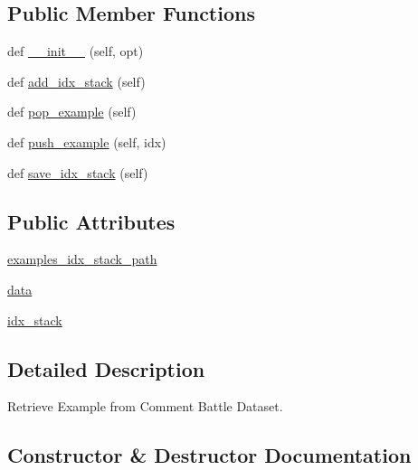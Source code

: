 \subsection*{Public Member Functions}
\begin{DoxyCompactItemize}
\item 
def \hyperlink{classigc__evals_1_1worlds_1_1IGCExampleGenerator_a44d9772a080f6ec923cdd13392a47f5e}{\+\_\+\+\_\+init\+\_\+\+\_\+} (self, opt)
\item 
def \hyperlink{classigc__evals_1_1worlds_1_1IGCExampleGenerator_aa0801aa3a53c7fd57a759c2080936174}{add\+\_\+idx\+\_\+stack} (self)
\item 
def \hyperlink{classigc__evals_1_1worlds_1_1IGCExampleGenerator_a68420b6b80ae5d3a8825302359371ed5}{pop\+\_\+example} (self)
\item 
def \hyperlink{classigc__evals_1_1worlds_1_1IGCExampleGenerator_a34dc6ef46a9ba8a1c72c8b674ff444b9}{push\+\_\+example} (self, idx)
\item 
def \hyperlink{classigc__evals_1_1worlds_1_1IGCExampleGenerator_a3f787da040d9b83d9c857b8ef65d36eb}{save\+\_\+idx\+\_\+stack} (self)
\end{DoxyCompactItemize}
\subsection*{Public Attributes}
\begin{DoxyCompactItemize}
\item 
\hyperlink{classigc__evals_1_1worlds_1_1IGCExampleGenerator_aa309ee59a607d747c0f9868951ecba0a}{examples\+\_\+idx\+\_\+stack\+\_\+path}
\item 
\hyperlink{classigc__evals_1_1worlds_1_1IGCExampleGenerator_ab21dfe02e8b60d4e37e25b8d942c4b61}{data}
\item 
\hyperlink{classigc__evals_1_1worlds_1_1IGCExampleGenerator_ac091cb764c64196d922d65d030f6ec57}{idx\+\_\+stack}
\end{DoxyCompactItemize}


\subsection{Detailed Description}
\begin{DoxyVerb}Retrieve Example from Comment Battle Dataset.
\end{DoxyVerb}
 

\subsection{Constructor \& Destructor Documentation}
\mbox{\label{classigc__evals_1_1worlds_1_1IGCExampleGenerator_a44d9772a080f6ec923cdd13392a47f5e}} 
